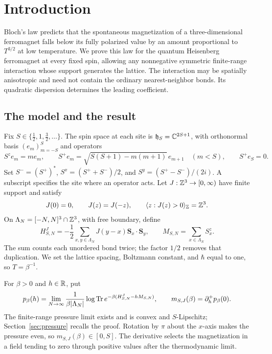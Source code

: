 \section{Introduction}
\label{sec:introduction}

Bloch's law predicts that the spontaneous magnetization of a
three-dimensional ferromagnet falls below its fully polarized value by
an amount proportional to $T^{3/2}$ at low temperature. We prove this
law for the quantum Heisenberg ferromagnet at every fixed spin, allowing
any nonnegative symmetric finite-range interaction whose support
generates the lattice. The interaction may be spatially anisotropic and need not
contain the ordinary nearest-neighbor bonds. Its quadratic dispersion
determines the leading coefficient.

\subsection{The model and the result}

Fix $S\in\{\tfrac12,1,\tfrac32,\ldots\}$. The spin space at each
site is $\mathfrak h_S=\mathbb C^{2S+1}$, with orthonormal basis
$(e_m)_{m=-S}^S$ and operators
\[
 S^ze_m=me_m,\qquad
 S^+e_m=\sqrt{S(S+1)-m(m+1)}\,e_{m+1}\quad(m<S),\qquad S^+e_S=0.
\]
Set $S^-=(S^+)^*$, $S^x=(S^++S^-)/2$, and
$S^y=(S^+-S^-)/(2i)$. A subscript specifies the site where an operator
acts. Let $J:\mathbb Z^3\to[0,\infty)$ have finite support and satisfy
\begin{equation}
 J(0)=0,\qquad J(z)=J(-z),\qquad
 \langle z:J(z)>0\rangle_{\mathbb Z}=\mathbb Z^3.
 \label{eq:interaction}
\end{equation}
On $\Lambda_N=[-N,N]^3\cap\mathbb Z^3$, with free boundary, define
\begin{equation}
 H^J_{S,N}=-\frac12\sum_{x,y\in\Lambda_N}
               J(y-x)\boldsymbol S_x\cdot\boldsymbol S_y,
 \qquad M_{S,N}=\sum_{x\in\Lambda_N}S_x^z.
 \label{eq:hamiltonian}
\end{equation}
The sum counts each unordered bond twice; the factor $1/2$ removes
that duplication. We set the lattice spacing, Boltzmann constant, and
$\hbar$ equal to one, so $T=\beta^{-1}$.

For $\beta>0$ and $h\in\mathbb R$, put
\begin{equation}
 p_\beta(h)=\lim_{N\to\infty}\frac1{\beta|\Lambda_N|}
       \log\operatorname{Tr} e^{-\beta(H^J_{S,N}-hM_{S,N})},
 \qquad m_{S,J}(\beta)=\partial_h^+p_\beta(0).
 \label{eq:pressure-magnetization}
\end{equation}
The finite-range pressure limit exists and is convex and $S$-Lipschitz;
Section~\ref{sec:pressure} recalls the proof. Rotation by $\pi$ about
the $x$-axis makes the pressure even, so $m_{S,J}(\beta)\in[0,S]$.
The derivative selects the magnetization in a field tending to zero
through positive values after the thermodynamic limit.

